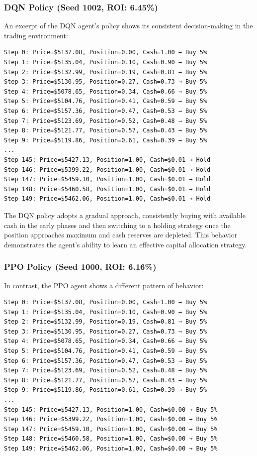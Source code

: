 \documentclass[11pt]{article}
\begin{document}
\subsubsection{DQN Policy (Seed 1002, ROI: 6.45\%)}
An excerpt of the DQN agent's policy shows its consistent decision-making in the trading environment:
\begin{verbatim}
Step 0: Price=$5137.08, Position=0.00, Cash=1.00 → Buy 5%
Step 1: Price=$5135.04, Position=0.10, Cash=0.90 → Buy 5%
Step 2: Price=$5132.99, Position=0.19, Cash=0.81 → Buy 5%
Step 3: Price=$5130.95, Position=0.27, Cash=0.73 → Buy 5%
Step 4: Price=$5078.65, Position=0.34, Cash=0.66 → Buy 5%
Step 5: Price=$5104.76, Position=0.41, Cash=0.59 → Buy 5%
Step 6: Price=$5157.36, Position=0.47, Cash=0.53 → Buy 5%
Step 7: Price=$5123.69, Position=0.52, Cash=0.48 → Buy 5%
Step 8: Price=$5121.77, Position=0.57, Cash=0.43 → Buy 5%
Step 9: Price=$5119.86, Position=0.61, Cash=0.39 → Buy 5%
...
Step 145: Price=$5427.13, Position=1.00, Cash=$0.01 → Hold
Step 146: Price=$5399.22, Position=1.00, Cash=$0.01 → Hold
Step 147: Price=$5459.10, Position=1.00, Cash=$0.01 → Hold
Step 148: Price=$5460.58, Position=1.00, Cash=$0.01 → Hold
Step 149: Price=$5462.06, Position=1.00, Cash=$0.01 → Hold
\end{verbatim}

The DQN policy adopts a gradual approach, consistently buying with available cash in the early phases and then switching to a holding strategy once the position approaches maximum and cash reserves are depleted. This behavior demonstrates the agent's ability to learn an effective capital allocation strategy.

\subsubsection{PPO Policy (Seed 1000, ROI: 6.16\%)}
In contrast, the PPO agent shows a different pattern of behavior:
\begin{verbatim}
Step 0: Price=$5137.08, Position=0.00, Cash=1.00 → Buy 5%
Step 1: Price=$5135.04, Position=0.10, Cash=0.90 → Buy 5%
Step 2: Price=$5132.99, Position=0.19, Cash=0.81 → Buy 5%
Step 3: Price=$5130.95, Position=0.27, Cash=0.73 → Buy 5%
Step 4: Price=$5078.65, Position=0.34, Cash=0.66 → Buy 5%
Step 5: Price=$5104.76, Position=0.41, Cash=0.59 → Buy 5%
Step 6: Price=$5157.36, Position=0.47, Cash=0.53 → Buy 5%
Step 7: Price=$5123.69, Position=0.52, Cash=0.48 → Buy 5%
Step 8: Price=$5121.77, Position=0.57, Cash=0.43 → Buy 5%
Step 9: Price=$5119.86, Position=0.61, Cash=0.39 → Buy 5%
...
Step 145: Price=$5427.13, Position=1.00, Cash=$0.00 → Buy 5%
Step 146: Price=$5399.22, Position=1.00, Cash=$0.00 → Buy 5%
Step 147: Price=$5459.10, Position=1.00, Cash=$0.00 → Buy 5%
Step 148: Price=$5460.58, Position=1.00, Cash=$0.00 → Buy 5%
Step 149: Price=$5462.06, Position=1.00, Cash=$0.00 → Buy 5%
\end{verbatim}
\end{document}
